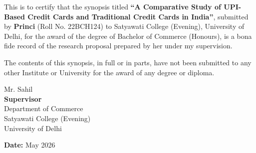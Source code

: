 
This is to certify that the synopsis titled \textbf{``A Comparative Study of UPI-Based Credit
Cards and Traditional Credit Cards in India''}, submitted by \textbf{Princi} (Roll No. 22BCH124) to Satyawati College (Evening), University of Delhi, for the award of the degree of Bachelor of Commerce (Honours), is a bona fide record of the research proposal prepared by her under my supervision.

The contents of this synopsis, in full or in parts, have not been submitted to any other Institute or University for the award of any degree or diploma.

\vspace{4cm}

\noindent
Mr. Sahil \\
\textbf{Supervisor} \\
Department of Commerce \\
Satyawati College (Evening) \\
University of Delhi

\vspace{2cm}

\noindent
\textbf{Date:} May 2026

